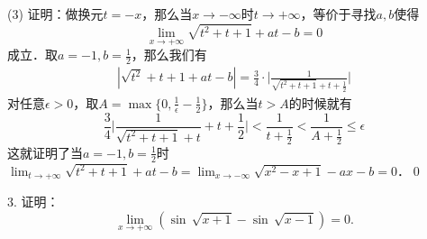 (3) 证明：做换元$t=-x$，那么当$x \to -\infty$时$t \to +\infty$，等价于寻找$a,b$使得
\begin{equation}
    \displaystyle\lim_{x \to +\infty}\sqrt{t^2+t+1}+at-b=0
\end{equation}
成立．取$a=-1,b=\displaystyle\frac{1}{2}$，那么我们有
\begin{align}
    |\sqrt{t^2}+t+1+at-b|=\frac{3}{4} \cdot \Bigg\lvert\displaystyle\frac{1}{\displaystyle\sqrt{t^2+t+1}+t+\displaystyle\frac{1}{2}} \Bigg\rvert
\end{align}
对任意$\epsilon>0$，取$A=\max\{0, \displaystyle\frac{1}{\epsilon}-\displaystyle\frac{1}{2}\}$，那么当$t>A$的时候就有
\begin{equation}
    \displaystyle\frac{3}{4}\Bigg\lvert\displaystyle\frac{1}{\sqrt{t^2+t+1}+t}+t+\displaystyle\frac{1}{2}\Bigg\rvert<\frac{1}{t+\displaystyle\frac{1}{2}}<\frac{1}{A+\displaystyle\frac{1}{2}} \leq \epsilon
\end{equation}
这就证明了当$a=-1,b=\displaystyle\frac{1}{2}$时$\displaystyle\lim_{t\to +\infty}\sqrt{t^2+t+1}+at-b=\displaystyle\lim_{x\to -\infty}\sqrt{x^2-x+1}-ax-b=0$．\qed

3. 证明：
\begin{equation}
    \lim_{x \to +\infty} \left(\sin \, \sqrt{x+1} - \sin \, \sqrt{x-1}\right) = 0.
\end{equation}

